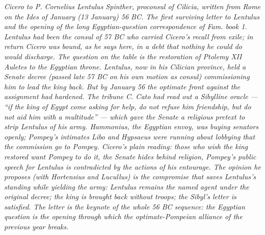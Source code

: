 
\textit{Cicero to P. Cornelius Lentulus Spinther, proconsul of
Cilicia, written from Rome on the Ides of January (13 January)
56 BC. The first surviving letter to Lentulus and the opening
of the long Egyptian-question correspondence of Fam. book 1.
Lentulus had been the consul of 57 BC who carried Cicero's
recall from exile; in return Cicero was bound, as he says here,
in a debt that nothing he could do would discharge. The
question on the table is the restoration of Ptolemy XII Auletes
to the Egyptian throne. Lentulus, now in his Cilician province,
held a Senate decree (passed late 57 BC on his own motion as
consul) commissioning him to lead the king back. But by January
56 the optimate front against the assignment had hardened.
The tribune C. Cato had read out a Sibylline oracle ---
``if the king of Egypt come asking for help, do not refuse him
friendship, but do not aid him with a multitude'' --- which gave
the Senate a religious pretext to strip Lentulus of his army.
Hammonius, the Egyptian envoy, was buying senators openly;
Pompey's intimates Libo and Hypsaeus were running about lobbying
that the commission go to Pompey. Cicero's plain reading: those
who wish the king restored want Pompey to do it, the Senate
hides behind religion, Pompey's public speech for Lentulus is
contradicted by the actions of his entourage. The opinion he
proposes (with Hortensius and Lucullus) is the compromise that
saves Lentulus's standing while yielding the army: Lentulus
remains the named agent under the original decree; the king
is brought back without troops; the Sibyl's letter is
satisfied. The letter is the keynote of the whole 56 BC
sequence: the Egyptian question is the opening through which
the optimate-Pompeian alliance of the previous year breaks.}
